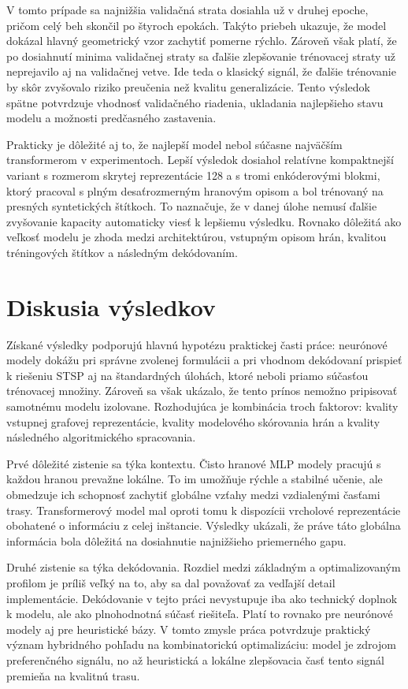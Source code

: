 \indent V tomto prípade sa najnižšia validačná strata dosiahla už v druhej
epoche, pričom celý beh skončil po štyroch epokách. Takýto priebeh ukazuje, že
model dokázal hlavný geometrický vzor zachytiť pomerne rýchlo. Zároveň však
platí, že po dosiahnutí minima validačnej straty sa ďalšie zlepšovanie
trénovacej straty už neprejavilo aj na validačnej vetve. Ide teda o klasický
signál, že ďalšie trénovanie by skôr zvyšovalo riziko preučenia než kvalitu
generalizácie. Tento výsledok spätne potvrdzuje vhodnosť validačného riadenia,
ukladania najlepšieho stavu modelu a možnosti predčasného zastavenia.

\indent Prakticky je dôležité aj to, že najlepší model nebol súčasne najväčším
transformerom v experimentoch. Lepší výsledok dosiahol relatívne kompaktnejší
variant s rozmerom skrytej reprezentácie 128 a s tromi enkóderovými blokmi,
ktorý pracoval s plným desaťrozmerným hranovým opisom a bol trénovaný na
presných syntetických štítkoch. To naznačuje, že v danej úlohe nemusí ďalšie
zvyšovanie kapacity automaticky viesť k lepšiemu výsledku. Rovnako dôležitá ako
veľkosť modelu je zhoda medzi architektúrou, vstupným opisom hrán, kvalitou
tréningových štítkov a následným dekódovaním.

\section{Diskusia výsledkov}
\indent Získané výsledky podporujú hlavnú hypotézu praktickej časti práce:
neurónové modely dokážu pri správne zvolenej formulácii a pri vhodnom
dekódovaní prispieť k riešeniu STSP aj na štandardných úlohách, ktoré neboli
priamo súčasťou trénovacej množiny. Zároveň sa však ukázalo, že tento prínos
nemožno pripisovať samotnému modelu izolovane. Rozhodujúca je kombinácia troch
faktorov: kvality vstupnej grafovej reprezentácie, kvality modelového skórovania
hrán a kvality následného algoritmického spracovania.

\indent Prvé dôležité zistenie sa týka kontextu. Čisto hranové MLP modely
pracujú s každou hranou prevažne lokálne. To im umožňuje rýchle a stabilné
učenie, ale obmedzuje ich schopnosť zachytiť globálne vzťahy medzi vzdialenými
časťami trasy. Transformerový model mal oproti tomu k dispozícii vrcholové
reprezentácie obohatené o informáciu z celej inštancie. Výsledky ukázali, že
práve táto globálna informácia bola dôležitá na dosiahnutie najnižšieho
priemerného gapu.

\indent Druhé zistenie sa týka dekódovania. Rozdiel medzi základným a
optimalizovaným profilom je príliš veľký na to, aby sa dal považovať za
vedľajší detail implementácie. Dekódovanie v tejto práci nevystupuje iba ako
technický doplnok k modelu, ale ako plnohodnotná súčasť riešiteľa. Platí to
rovnako pre neurónové modely aj pre heuristické bázy. V tomto zmysle práca
potvrdzuje praktický význam hybridného pohľadu na kombinatorickú optimalizáciu:
model je zdrojom preferenčného signálu, no až heuristická a lokálne zlepšovacia
časť tento signál premieňa na kvalitnú trasu.

